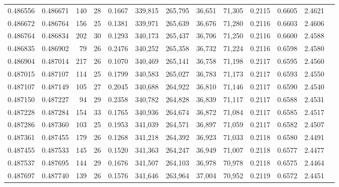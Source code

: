 \begin{tabular}{rrrrrrrrrrrrr}
0.486556 & 0.486671 & 140 &  28 &                                     0.1667 & 339,815 & 265,795 &  36,651 &  71,305 & 0.2115 & 0.6605 & 2.4621 \\
0.486672 & 0.486764 & 156 &  25 &                                     0.1381 & 339,971 & 265,639 &  36,676 &  71,280 & 0.2116 & 0.6603 & 2.4606 \\
0.486764 & 0.486834 & 202 &  30 &                                     0.1293 & 340,173 & 265,437 &  36,706 &  71,250 & 0.2116 & 0.6600 & 2.4588 \\
0.486835 & 0.486902 &  79 &  26 &                                     0.2476 & 340,252 & 265,358 &  36,732 &  71,224 & 0.2116 & 0.6598 & 2.4580 \\
0.486904 & 0.487014 & 217 &  26 &                                     0.1070 & 340,469 & 265,141 &  36,758 &  71,198 & 0.2117 & 0.6595 & 2.4560 \\
0.487015 & 0.487107 & 114 &  25 &                                     0.1799 & 340,583 & 265,027 &  36,783 &  71,173 & 0.2117 & 0.6593 & 2.4550 \\
0.487107 & 0.487149 & 105 &  27 &                                     0.2045 & 340,688 & 264,922 &  36,810 &  71,146 & 0.2117 & 0.6590 & 2.4540 \\
0.487150 & 0.487227 &  94 &  29 &                                     0.2358 & 340,782 & 264,828 &  36,839 &  71,117 & 0.2117 & 0.6588 & 2.4531 \\
0.487228 & 0.487284 & 154 &  33 &                                     0.1765 & 340,936 & 264,674 &  36,872 &  71,084 & 0.2117 & 0.6585 & 2.4517 \\
0.487286 & 0.487360 & 103 &  25 &                                     0.1953 & 341,039 & 264,571 &  36,897 &  71,059 & 0.2117 & 0.6582 & 2.4507 \\
0.487361 & 0.487455 & 179 &  26 &                                     0.1268 & 341,218 & 264,392 &  36,923 &  71,033 & 0.2118 & 0.6580 & 2.4491 \\
0.487455 & 0.487533 & 145 &  26 &                                     0.1520 & 341,363 & 264,247 &  36,949 &  71,007 & 0.2118 & 0.6577 & 2.4477 \\
0.487537 & 0.487695 & 144 &  29 &                                     0.1676 & 341,507 & 264,103 &  36,978 &  70,978 & 0.2118 & 0.6575 & 2.4464 \\
0.487697 & 0.487740 & 139 &  26 &                                     0.1576 & 341,646 & 263,964 &  37,004 &  70,952 & 0.2119 & 0.6572 & 2.4451 \\

\end{tabular}
